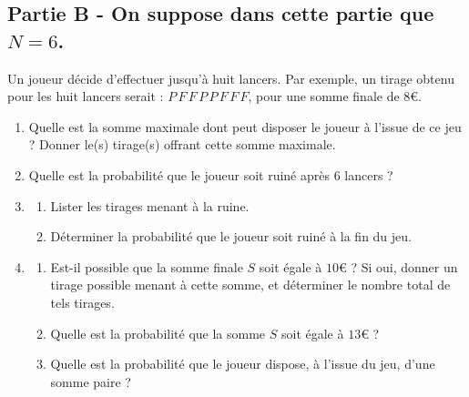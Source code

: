 \documentclass[12pt]{article}
\theoremstyle{break}
\begin{document}
\subsection*{Partie B - On suppose dans cette partie que \( N = 6 \).}
Un joueur décide d’effectuer jusqu’à huit lancers. Par exemple, un tirage obtenu pour les huit lancers serait : \( P \, F \, F \, P \, P \, F \, F \, F \), pour une somme finale de \( 8€ \).
\begin{enumerate}
    \item Quelle est la somme maximale dont peut disposer le joueur à l’issue de ce jeu ? Donner le(s) tirage(s) offrant cette somme maximale.
    \item Quelle est la probabilité que le joueur soit ruiné après 6 lancers ?
    \item 
    \begin{enumerate}
        \item Lister les tirages menant à la ruine.
        \item Déterminer la probabilité que le joueur soit ruiné à la fin du jeu.
    \end{enumerate}
    \item 
    \begin{enumerate}
        \item Est-il possible que la somme finale \( S \) soit égale à \( 10€ \) ? Si oui, donner un tirage possible menant à cette somme, et déterminer le nombre total de tels tirages.
        \item Quelle est la probabilité que la somme \( S \) soit égale à \( 13€ \) ?
        \item Quelle est la probabilité que le joueur dispose, à l’issue du jeu, d’une somme paire ?
    \end{enumerate}
\end{enumerate}
\end{document}
